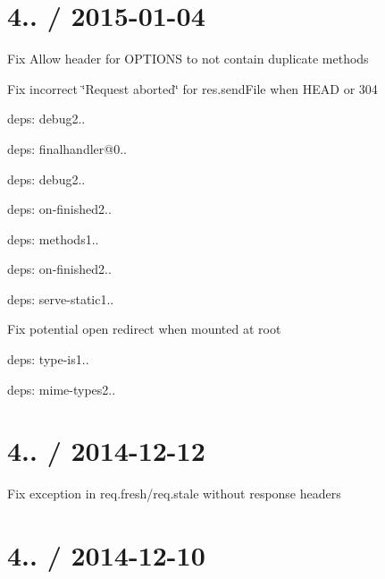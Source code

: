 \section*{4.. / 2015-\/01-\/04 }


\begin{DoxyItemize}
\item Fix {\ttfamily Allow} header for {\ttfamily O\+P\+T\+I\+O\+N\+S} to not contain duplicate methods
\item Fix incorrect \char`\"{}\+Request aborted\char`\"{} for {\ttfamily res.\+send\+File} when {\ttfamily H\+E\+A\+D} or 304
\item deps\+: debug2..
\item deps\+: finalhandler@0..
\begin{DoxyItemize}
\item deps\+: debug2..
\item deps\+: on-\/finished2..
\end{DoxyItemize}
\item deps\+: methods1..
\item deps\+: on-\/finished2..
\item deps\+: serve-\/static1..
\begin{DoxyItemize}
\item Fix potential open redirect when mounted at root
\end{DoxyItemize}
\item deps\+: type-\/is1..
\begin{DoxyItemize}
\item deps\+: mime-\/types2..
\end{DoxyItemize}
\end{DoxyItemize}

\section*{4.. / 2014-\/12-\/12 }


\begin{DoxyItemize}
\item Fix exception in {\ttfamily req.\+fresh}/{\ttfamily req.\+stale} without response headers
\end{DoxyItemize}

\section*{4.. / 2014-\/12-\/10 }


